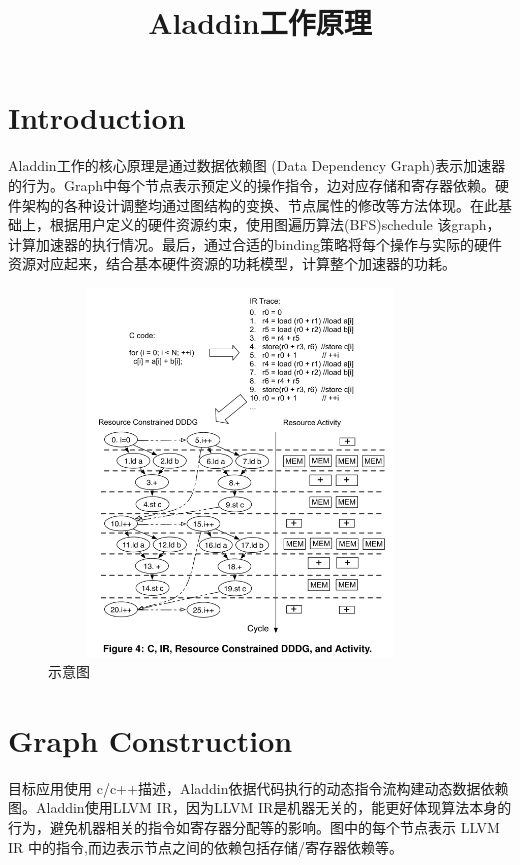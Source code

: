 \documentclass[UTF8]{scrartcl}
\title{Aladdin工作原理}
\author{}
\begin{document}
\maketitle


\section{Introduction}

	Aladdin工作的核心原理是通过数据依赖图 (Data Dependency	Graph)表示加速器的行为。Graph中每个节点表示预定义的操作指令，边对应存储和寄存器依赖。硬件架构的各种设计调整均通过图结构的变换、节点属性的修改等方法体现。在此基础上，根据用户定义的硬件资源约束，使用图遍历算法(BFS)schedule 该graph，计算加速器的执行情况。最后，通过合适的binding策略将每个操作与实际的硬件资源对应起来，结合基本硬件资源的功耗模型，计算整个加速器的功耗。
	
				\begin{figure}[h]
					\centering
					\includegraphics[width=4.00in,height=3.85in]{aladdin.png} 
					\caption{示意图}
					\label{fig1}
				\end{figure}
	
\section{Graph Construction}

	目标应用使用 c/c++描述，Aladdin依据代码执行的动态指令流构建动态数据依赖图。Aladdin使用LLVM IR，因为LLVM IR是机器无关的，能更好体现算法本身的行为，避免机器相关的指令如寄存器分配等的影响。图中的每个节点表示 LLVM IR 中的指令,而边表示节点之间的依赖包括存储/寄存器依赖等。
	
\end{document}
